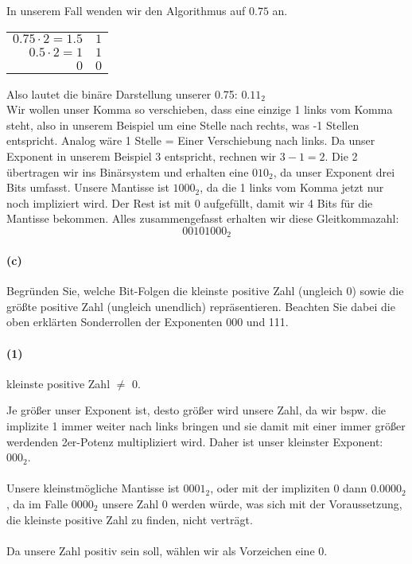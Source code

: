 \documentclass[12pt, letterpaper]{article}
\begin{document}
\noindent In unserem Fall wenden wir den Algorithmus auf $0.75$ an.\newline

\begin{tabular}{r|l}
 $0.75 \cdot 2 = 1.5$ & $1$ \\
 $0.5 \cdot 2 = 1$ & $1$ \\
 $0$ & $0$
\end{tabular}\newline\newline

\noindent Also lautet die binäre Darstellung unserer 0.75: $0.11_2$\\
\noindent Wir wollen unser Komma so verschieben, dass eine einzige 1 links vom Komma steht, also in unserem Beispiel um eine Stelle nach rechts, was -1 Stellen entspricht. Analog wäre 1 Stelle = Einer Verschiebung nach links. Da unser Exponent in unserem Beispiel 3 entspricht, rechnen wir $3 - 1 = 2$.
Die 2 übertragen wir ins Binärsystem und erhalten eine $010_2$, da unser Exponent drei Bits umfasst. Unsere Mantisse ist $1000_2$, da die 1 links vom Komma jetzt nur noch impliziert wird. Der Rest ist mit 0 aufgefüllt, damit wir 4 Bits für die Mantisse bekommen. Alles zusammengefasst erhalten wir diese Gleitkommazahl:\\

$$00101000_2$$

\paragraph{(c)} Begründen Sie, welche Bit-Folgen die kleinste positive Zahl (ungleich 0) sowie die größte positive Zahl (ungleich unendlich) repräsentieren. Beachten Sie dabei die oben erklärten
Sonderrollen der Exponenten 000 und 111. \newline

\paragraph{(1)} kleinste positive Zahl $\neq$ 0.\newline

\noindent Je größer unser Exponent ist, desto größer wird unsere Zahl, da wir bspw. die implizite 1 immer weiter nach links bringen und sie damit mit einer immer größer werdenden 2er-Potenz multipliziert wird. Daher ist unser kleinster Exponent: $000_2$.\\ \\
\noindent Unsere kleinstmögliche Mantisse ist $0001_2$, oder mit der impliziten 0 dann $0.0000_2$, da im Falle $0000_2$ unsere Zahl 0 werden würde, was sich mit der Voraussetzung, die kleinste positive Zahl zu finden, nicht verträgt.\\ \\
\noindent Da unsere Zahl positiv sein soll, wählen wir als Vorzeichen eine 0.
\end{document}
